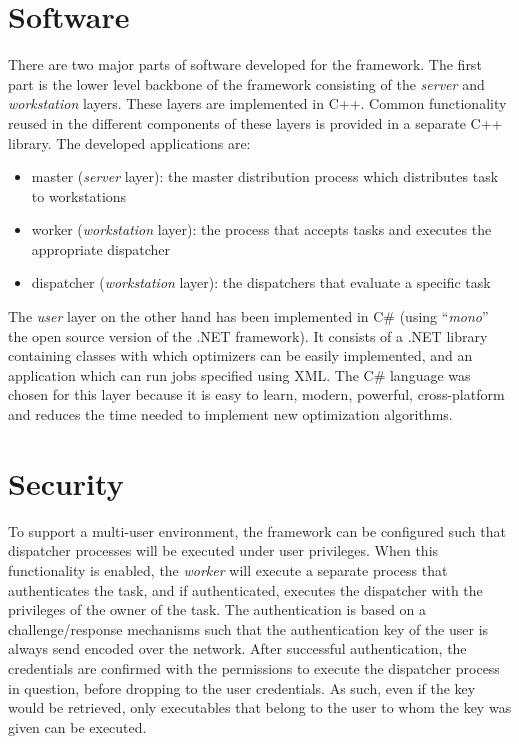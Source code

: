 \documentclass{report}
\begin{document}
\section{Software}
There are two major parts of software developed for the framework. The first
part is the lower level backbone of the framework consisting of the
\textit{server} and \textit{workstation} layers. These layers are implemented in
C++. Common functionality reused in the different components of these layers
is provided in a separate C++ library. The developed applications are:

\begin{itemize}
	\item master (\textit{server} layer): the master distribution process which
	distributes task to workstations
	\item worker (\textit{workstation} layer): the process that accepts tasks
	and executes the appropriate dispatcher
	\item dispatcher (\textit{workstation} layer): the dispatchers that
	evaluate a specific task
\end{itemize}

The \textit{user} layer on the other hand has been implemented in C\# (using
``\textit{mono}'' the open source version of the .NET framework). It consists of a
.NET library containing classes with which optimizers can be easily implemented,
and an application which can run jobs specified using XML. The C\# language
was chosen for this layer because it is easy to learn, modern, powerful,
cross-platform and reduces the time needed to implement new optimization
algorithms.

\section{Security}\label{sec:security}
To support a multi-user environment, the framework can be configured such that
dispatcher processes will be executed under user privileges. When this
functionality is enabled, the \textit{worker} will execute a separate process
that authenticates the task, and if authenticated, executes the dispatcher with
the privileges of the owner of the task. The authentication is based on
a challenge/response mechanisms such that the authentication key of the user
is always send encoded over the network. After successful authentication, the
credentials are confirmed with the permissions to execute the dispatcher
process in question, before dropping to the user credentials. As such, even
if the key would be retrieved, only executables that belong to the user
to whom the key was given can be executed.
\end{document}
